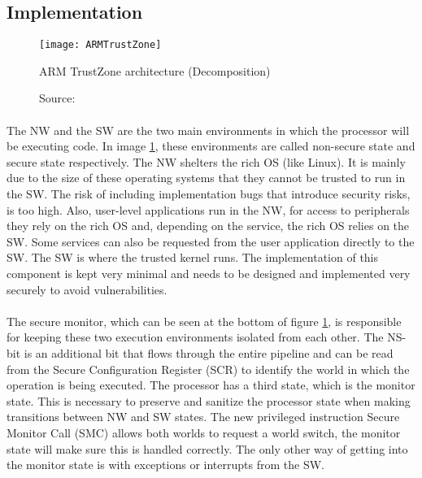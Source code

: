 \subsection*{Implementation}

\begin{figure}[h]
\centering
\texttt{[image: ARMTrustZone]}
\caption{ARM TrustZone architecture (Decomposition)}
\caption*{Source: \cite{PintoSandro2019DATA}}
\label{TZ}
\end{figure}

\paragraph*{}
The NW and the SW are the two main environments in which the processor will be executing code. In image \ref{TZ}, these environments are called non-secure state and secure state respectively. The NW shelters the rich OS (like Linux). It is mainly due to the size of these operating systems that they cannot be trusted to run in the SW. The risk of including implementation bugs that introduce security risks, is too high. Also, user-level applications run in the NW, for access to peripherals they rely on the rich OS and, depending on the service, the rich OS relies on the SW. Some services can also be requested from the user application directly to the SW. The SW is where the trusted kernel runs. The implementation of this component is kept very minimal and needs to be designed and implemented very securely to avoid vulnerabilities.

\paragraph*{}
The secure monitor, which can be seen at the bottom of figure \ref{TZ}, is responsible for keeping these two execution environments isolated from each other. The NS-bit is an additional bit that flows through the entire pipeline and can be read from the Secure Configuration Register (SCR) to identify the world in which the operation is being executed. The processor has a third state, which is the monitor state. This is necessary to preserve and sanitize the processor state when making transitions between NW and SW states. The new privileged instruction Secure Monitor Call (SMC) allows both worlds to request a world switch, the monitor state will make sure this is handled correctly. The only other way of getting into the monitor state is with exceptions or interrupts from the SW.

